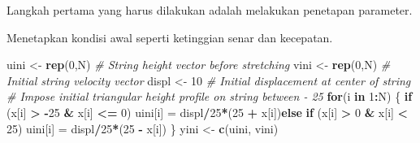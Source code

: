 \documentclass[
]{book}
\newenvironment{Shaded}{\begin{snugshade}}{\end{snugshade}}
\newcommand{\AttributeTok}[1]{\textcolor[rgb]{0.13,0.29,0.53}{#1}}
\newcommand{\CommentTok}[1]{\textcolor[rgb]{0.56,0.35,0.01}{\textit{#1}}}
\newcommand{\ControlFlowTok}[1]{\textcolor[rgb]{0.13,0.29,0.53}{\textbf{#1}}}
\newcommand{\DecValTok}[1]{\textcolor[rgb]{0.00,0.00,0.81}{#1}}
\newcommand{\FloatTok}[1]{\textcolor[rgb]{0.00,0.00,0.81}{#1}}
\newcommand{\FunctionTok}[1]{\textcolor[rgb]{0.13,0.29,0.53}{\textbf{#1}}}
\newcommand{\NormalTok}[1]{#1}
\newcommand{\OtherTok}[1]{\textcolor[rgb]{0.56,0.35,0.01}{#1}}
\newcommand{\SpecialCharTok}[1]{\textcolor[rgb]{0.81,0.36,0.00}{\textbf{#1}}}
\theoremstyle{definition}
\theoremstyle{definition}
\theoremstyle{definition}
\theoremstyle{definition}
\theoremstyle{remark}
\begin{document}
Langkah pertama yang harus dilakukan adalah melakukan penetapan parameter.

\begin{Shaded}
\end{Shaded}

Menetapkan kondisi awal seperti ketinggian senar dan kecepatan.

\begin{Shaded}
\begin{Highlighting}[]
\NormalTok{uini  }\OtherTok{\textless{}{-}} \FunctionTok{rep}\NormalTok{(}\DecValTok{0}\NormalTok{,N) }\CommentTok{\# String height vector before stretching}
\NormalTok{vini  }\OtherTok{\textless{}{-}} \FunctionTok{rep}\NormalTok{(}\DecValTok{0}\NormalTok{,N) }\CommentTok{\# Initial string velocity vector}
\NormalTok{displ }\OtherTok{\textless{}{-}} \DecValTok{10}       \CommentTok{\# Initial displacement at center of string}
\CommentTok{\# Impose initial triangular height profile on string between {-} 25}
\ControlFlowTok{for}\NormalTok{(i }\ControlFlowTok{in} \DecValTok{1}\SpecialCharTok{:}\NormalTok{N) \{}
  \ControlFlowTok{if}\NormalTok{ (x[i] }\SpecialCharTok{\textgreater{}} \SpecialCharTok{{-}}\DecValTok{25} \SpecialCharTok{\&}\NormalTok{ x[i] }\SpecialCharTok{\textless{}=} \DecValTok{0}\NormalTok{) uini[i] }\OtherTok{=}\NormalTok{ displ}\SpecialCharTok{/}\DecValTok{25}\SpecialCharTok{*}\NormalTok{(}\DecValTok{25} \SpecialCharTok{+}\NormalTok{ x[i])}\ControlFlowTok{else}
  \ControlFlowTok{if}\NormalTok{ (x[i] }\SpecialCharTok{\textgreater{}} \DecValTok{0} \SpecialCharTok{\&}\NormalTok{ x[i] }\SpecialCharTok{\textless{}} \DecValTok{25}\NormalTok{) uini[i] }\OtherTok{=}\NormalTok{ displ}\SpecialCharTok{/}\DecValTok{25}\SpecialCharTok{*}\NormalTok{(}\DecValTok{25} \SpecialCharTok{{-}}\NormalTok{ x[i])}
\NormalTok{\}}
\NormalTok{yini  }\OtherTok{\textless{}{-}} \FunctionTok{c}\NormalTok{(uini, vini)}
\end{Highlighting}
\end{Shaded}
\end{document}
